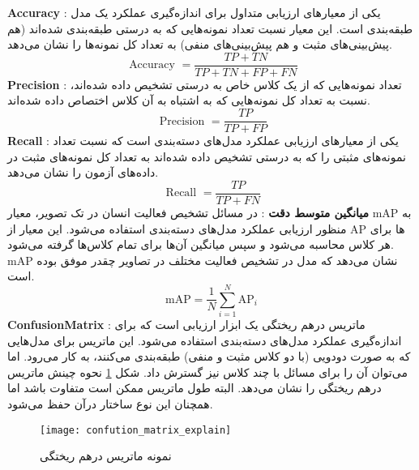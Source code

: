   \textbf{\gls{Accuracy}}
  : یکی از معیارهای ارزیابی متداول برای اندازه‌گیری عملکرد یک مدل طبقه‌بندی است. این معیار نسبت تعداد نمونه‌هایی که به درستی طبقه‌بندی شده‌اند (هم پیش‌بینی‌های مثبت و هم پیش‌بینی‌های منفی) به تعداد کل نمونه‌ها را نشان می‌دهد.
\begin{equation}
	\text { Accuracy }=\frac{T P+T N}{T P+T N+F P+F N}
\end{equation}
\textbf{\gls{Precision}}
 : تعداد نمونه‌هایی که از یک کلاس خاص به درستی تشخیص داده شده‌اند، نسبت به تعداد کل نمونه‌هایی که به اشتباه به آن کلاس اختصاص داده شده‌اند.
  \begin{equation}
  	\text { Precision }=\frac{T P}{T P+F P}
  \end{equation}
  \textbf{\gls{Recall}}
 : یکی از معیارهای ارزیابی عملکرد مدل‌های دسته‌بندی است که نسبت تعداد نمونه‌های مثبتی را که به درستی تشخیص داده شده‌اند به تعداد کل نمونه‌های مثبت در داده‌های آزمون را نشان می‌دهد.
  \begin{equation}
  	\text { Recall }=\frac{T P}{T P+F N}
  \end{equation}
    \textbf{میانگین متوسط دقت}
: در مسائل تشخیص فعالیت انسان در تک تصویر، معیار mAP به منظور ارزیابی عملکرد مدل‌های دسته‌بندی استفاده می‌شود. این معیار از AP%
 ها برای هر کلاس محاسبه می‌شود و سپس میانگین آن‌ها برای تمام کلاس‌ها گرفته می‌شود. mAP نشان می‌دهد که مدل در تشخیص فعالیت مختلف در تصاویر چقدر موفق بوده است.
 \begin{equation}
 	\mathrm{mAP}=\frac{1}{N} \sum_{i=1}^N \mathrm{AP}_i
 \end{equation}
     \textbf{\gls{ConfusionMatrix}}
: ماتریس درهم ریختگی یک ابزار ارزیابی است که برای اندازه‌گیری عملکرد مدل‌های دسته‌بندی استفاده می‌شود. این ماتریس برای مدل‌هایی که به صورت دودویی (با دو کلاس مثبت و منفی) طبقه‌بندی می‌کنند، به کار می‌رود. اما می‌توان آن را برای مسائل با چند کلاس نیز گسترش داد. شکل %
\ref{fig:confution_matrix_explain}
نحوه چینش ماتریس درهم ریختگی را نشان می‌دهد. البته طول ماتریس ممکن است متفاوت باشد اما همچنان این نوع ساختار درآن حفظ می‌شود.
\begin{figure}[ht]
	\centerline{\texttt{[image: confution\_matrix\_explain]}}
	\caption{نمونه ماتریس درهم ریختگی}
	\label{fig:confution_matrix_explain}
\end{figure}
\vspace{-10pt}

